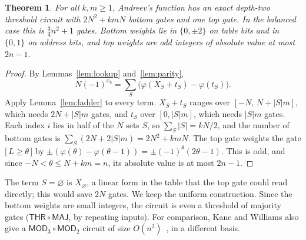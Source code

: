 \documentclass[11pt,letterpaper]{article}
\newtheorem{theorem}{Theorem}
\theoremstyle{remark}
\newcommand{\ind}[1]{\bigl[\,#1\,\bigr]}
\newcommand{\THR}{\mathsf{THR}}
\begin{document}
\begin{theorem}\label{thm:exact}
For all $k,m\ge1$, Andreev's function has an exact depth-two threshold
circuit with $2N^2+kmN$ bottom gates and one top gate. In the balanced case
this is $\tfrac34n^2+1$ gates. Bottom weights lie in $\{0,\pm2\}$ on table
bits and in $\{0,1\}$ on address bits, and
top weights are odd integers of absolute value at most $2n-1$.
\end{theorem}
\begin{proof}
By Lemmas~\ref{lem:lookup} and~\ref{lem:parity},
\[
N(-1)^{x_b}=\sum_S\bigl(\varphi(X_S+t_S)-\varphi(t_S)\bigr).
\]
Apply Lemma~\ref{lem:ladder} to every term. $X_S+t_S$ ranges over
$[-N,\,N+|S|m]$, which needs $2N+|S|m$ gates, and $t_S$ over $[0,|S|m]$,
which needs $|S|m$ gates. Each index $i$ lies in half of the $N$ sets $S$,
so $\sum_S|S|=kN/2$, and the number of bottom gates is
$\sum_S(2N+2|S|m)=2N^2+kmN$. The top gate weights the gate
$\ind{L\ge\theta}$ by $\pm(\varphi(\theta)-\varphi(\theta-1))=\pm(-1)^\theta(2\theta-1)$.
This is odd, and since $-N<\theta\le N+km=n$, its absolute value is at most
$2n-1$.
\end{proof}
The term $S=\varnothing$ is $X_\varnothing$, a linear form in the table that the
top gate could read directly; this would save $2N$ gates. We keep the uniform
construction.
Since the bottom weights are small integers, the circuit is even a threshold
of majority gates ($\THR\circ\mathsf{MAJ}$, by repeating inputs). For
comparison, Kane and Williams also give a $\mathsf{MOD}_3\circ\mathsf{MOD}_2$
circuit of size $O(n^2)$~\cite[Thm.~1.2]{KW}, in a different basis.
\end{document}
